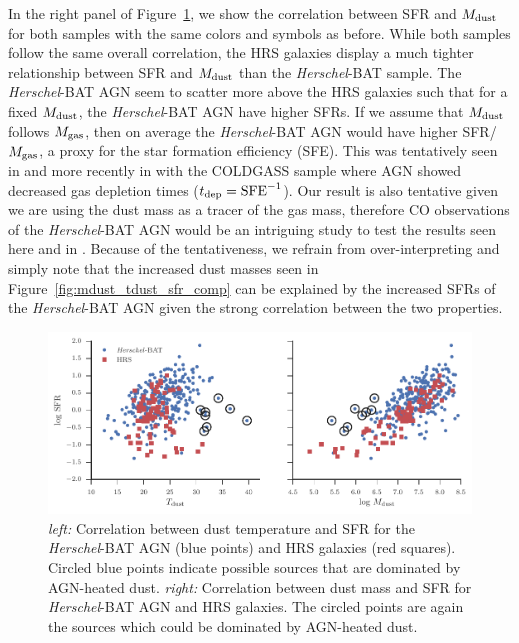 \documentclass[fleqn, usenatbib]{mnras}
\newcommand{\herschel}{\emph{Herschel}}
\newcommand{\mdust}{$M_{\rm dust}$}
\begin{document}
In the right panel of Figure~\ref{fig:sfr_tdust}, we show the correlation between SFR and \mdust{} for both samples with the same colors and symbols as before. While both samples follow the same overall correlation, the HRS galaxies display a much tighter relationship between SFR and \mdust{} than the \herschel-BAT sample. The \herschel-BAT AGN seem to scatter more above the HRS galaxies such that for a fixed \mdust, the \herschel-BAT AGN have higher SFRs. If we assume that \mdust{} follows $M_{\rm gas}$, then on average the \herschel-BAT AGN would have higher SFR/$M_{\rm gas}$, a proxy for the star formation efficiency (SFE). This was tentatively seen in \citet{Maiolino:1997vn} and more recently in \citet{Saintonge:2012uq} with the COLDGASS sample where AGN showed decreased gas depletion times ($t_{\rm dep} = \rm{SFE}^{-1}$). Our result is also tentative given we are using the dust mass as a tracer of the gas mass, therefore CO observations of the \herschel-BAT AGN would be an intriguing study to test the results seen here and in \citet{Saintonge:2012uq}. Because of the tentativeness, we refrain from over-interpreting and simply note that the increased dust masses seen in Figure~\ref{fig:mdust_tdust_sfr_comp} can be explained by the increased SFRs of the \herschel-BAT AGN given the strong correlation between the two properties.

\begin{figure}
\includegraphics[width=\textwidth]{figures/sfr_vs_tdust_and_mdust}
\caption{\textit{left:} Correlation between dust temperature and SFR for the \herschel-BAT AGN (blue points) and HRS galaxies (red squares). Circled blue points indicate possible sources that are dominated by AGN-heated dust. \textit{right:} Correlation between dust mass and SFR for \herschel-BAT AGN and HRS galaxies. The circled points are again the sources which could be dominated by AGN-heated dust. \label{fig:sfr_tdust}}
\end{figure}
\end{document}
